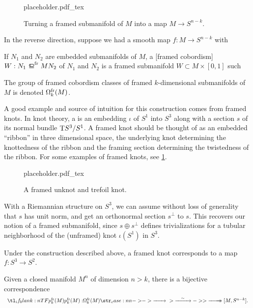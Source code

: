 \begin{figure}[ht]
	{placeholder.pdf_tex}
	\caption{Turning a framed submanifold of $M$ into a map $M\to S^{n-k}$.}
\end{figure}

In the reverse direction, suppose we had a smooth map $f : M \to S^{n-k}$ with 

\begin{definition}
	If $N_1$ and $N_2$ are embedded submanifolds of $M$, a [framed cobordism] $W : N_1 \frbord{M} N_2$ of $N_1$ and $N_2$ is a framed submanifold $W\subset M\times [0,1]$ such 
\end{definition}

\begin{definition}
	The group of framed cobordism classes of framed $k$-dimensional submanifolds of $M$ is denoted $\Omega^{\mathrm{fr}}_k(M)$.
\end{definition}

A good example and source of intuition for this construction comes from framed knots. In knot theory, a  is an embedding $\iota$ of $S^1$ into $S^3$ along with a section $s$ of its normal bundle $\mathrm{T} S^3/S^1$. A framed knot should be thought of as an embedded ``ribbon'' in three dimensional space, the underlying knot determining the knottedness of the ribbon and the framing section determining the twistedness of the ribbon. For some examples of framed knots, see \cref{fig:framed-knot-examples}.

\begin{figure}[ht]
	\centering
	{placeholder.pdf_tex}
	\caption{A framed unknot and trefoil knot.}\label{fig:framed-knot-examples}
\end{figure}

\begin{remark}
With a Riemannian structure on $S^3$, we can assume without loss of generality that $s$ has unit norm, and get an orthonormal section $s^\perp$ to $s$. This recovers our notion of a framed submanifold, since $s\oplus s^\perp$ defines trivializations for a tubular neighborhood of the (unframed) knot $\iota(S^1)$ in $S^3$.
\end{remark}

Under the construction described above, a framed knot corresponds to a map $f : S^3\to S^{2}$.

\begin{theorem}\label{thm:thom-pontryagin-isomorphism}
	Given a closed manifold $M^n$ of dimension $n>k$, there is a bijective correspondence
	\begin{equation}
		\lkxfunc{p^\fr_k(M)}{\Omega^\fr_k(M)}{{}[M, S^{n-k}].}
	\end{equation}
\end{theorem}

